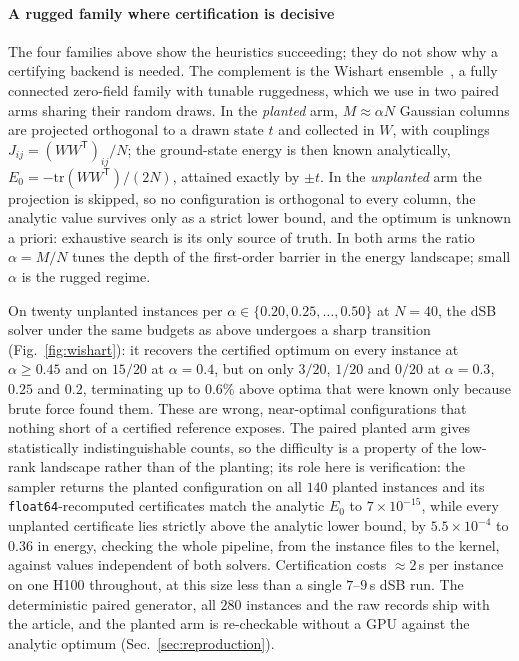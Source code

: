 \documentclass[12pt,a4paper]{elsarticle}
\begin{document}
\paragraph{A rugged family where certification is decisive}
The four families above show the heuristics succeeding; they do not show why a certifying
backend is needed. The complement is the Wishart ensemble~\cite{hamze2020wishart}, a fully
connected zero-field family with tunable ruggedness, which we use in two paired arms sharing
their random draws. In the \emph{planted} arm, $M \approx \alpha N$ Gaussian columns are
projected orthogonal to a drawn state $t$ and collected in $W$, with couplings
$J_{ij}=(WW^{\mathsf{T}})_{ij}/N$; the ground-state energy is then known analytically,
$E_0=-\mathrm{tr}(WW^{\mathsf{T}})/(2N)$, attained exactly by $\pm t$. In the
\emph{unplanted} arm the projection is skipped, so no configuration is orthogonal to every
column, the analytic value survives only as a strict lower bound, and the optimum is unknown
a priori: exhaustive search is its only source of truth. In both arms the ratio
$\alpha=M/N$ tunes the depth of the first-order barrier in the energy landscape; small
$\alpha$ is the rugged regime.

On twenty unplanted instances per $\alpha\in\{0.20,0.25,\dots,0.50\}$ at $N=40$, the dSB
solver under the same budgets as above undergoes a sharp transition
(Fig.~\ref{fig:wishart}): it recovers the certified optimum on every instance at
$\alpha\geq0.45$ and on $15/20$ at $\alpha=0.4$, but on only $3/20$, $1/20$ and $0/20$ at
$\alpha=0.3$, $0.25$ and $0.2$, terminating up to $0.6\%$ above optima that were known only
because brute force found them. These are wrong, near-optimal configurations that nothing
short of a certified reference exposes. The paired planted arm gives statistically indistinguishable
counts, so the difficulty is a property of the low-rank landscape rather than of the
planting; its role here is verification: the sampler returns the planted configuration on
all $140$ planted instances and its \texttt{float64}-recomputed certificates match the
analytic $E_0$ to $7\times10^{-15}$, while every unplanted certificate lies strictly above
the analytic lower bound, by $5.5\times10^{-4}$ to $0.36$ in energy, checking the whole
pipeline, from the instance files to the kernel, against values independent of both solvers.
Certification costs $\approx\!2$\,s per instance on one H100 throughout, at this size less
than a single $7$--$9$\,s dSB run. The deterministic paired generator, all $280$ instances
and the raw records ship with the article, and the planted arm is re-checkable without a GPU
against the analytic optimum (Sec.~\ref{sec:reproduction}).
\end{document}
